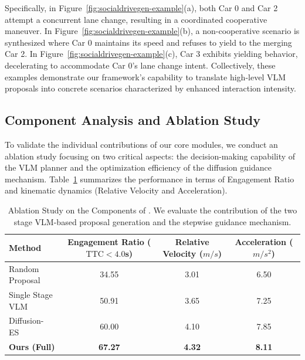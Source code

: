 Specifically, in Figure~\ref{fig:socialdrivegen-example}(a), both Car 0 and Car 2 attempt a concurrent lane change, resulting in a coordinated cooperative maneuver. In Figure~\ref{fig:socialdrivegen-example}(b), a non-cooperative scenario is synthesized where Car 0 maintains its speed and refuses to yield to the merging Car 2. In Figure~\ref{fig:socialdrivegen-example}(c), Car 3 exhibits yielding behavior, decelerating to accommodate Car 0’s lane change intent. Collectively, these examples demonstrate our framework's capability to translate high-level VLM proposals into concrete scenarios characterized by enhanced interaction intensity.

\subsection{Component Analysis and Ablation Study}

To validate the individual contributions of our core modules, we conduct an ablation study focusing on two critical aspects: the decision-making capability of the VLM planner and the optimization efficiency of the diffusion guidance mechanism. Table~\ref{tab:ablation_study} summarizes the performance in terms of Engagement Ratio and kinematic dynamics (Relative Velocity and Acceleration).

\begin{table}[ht]
\centering
\renewcommand{\arraystretch}{1.1}
\caption{Ablation Study on the Components of \our. We evaluate the contribution of the two stage VLM-based proposal generation and the stepwise guidance mechanism.}
\label{tab:ablation_study}
\setlength{\tabcolsep}{0pt}
\begin{tabular}{lccc}
\toprule
\textbf{Method} & 
\parbox[c]{3cm}{\centering \textbf{Engagement \\ Ratio }\\ ($\text{TTC} < 4.0$s)} & 
\parbox[c]{2.25cm}{\centering \textbf{Relative \\ Velocity \\ ($m/s$)}} & 
\parbox[c]{2.25cm}{\centering \textbf{ Acceleration \\ ($m/s^2$)}} \\
\midrule

 Random Proposal  & 34.55 & 3.01 & 6.50 \\
 Single Stage VLM & 50.91 & 3.65 & 7.25 \\
\midrule

    Diffusion-ES~\citep{yang2024diffusion} & 60.00 & 4.10 & 7.85 \\
\midrule

    \textbf{Ours (Full)} & \textbf{67.27} & \textbf{4.32} & \textbf{8.11} \\
\bottomrule
\end{tabular}
\end{table}

